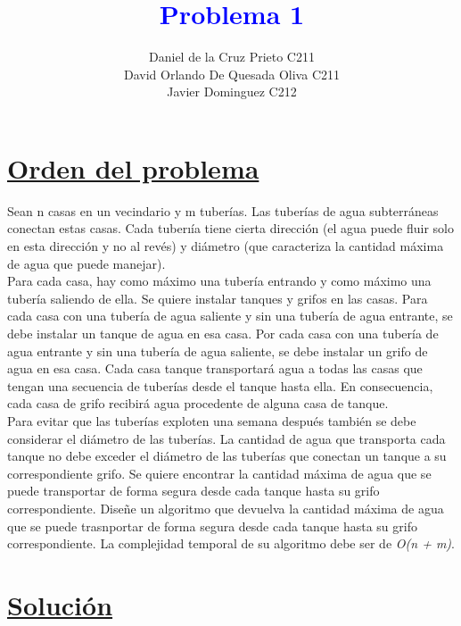 \documentclass{article}
\begin{document}
    \title{\textcolor{blue}{\textbf{Problema 1 }}\\}
    \author{Daniel de la Cruz Prieto C211\\ David Orlando De Quesada Oliva C211\\Javier Dominguez C212} 
    \date{}
    \maketitle  

    \section{\underline{Orden del problema}} 

    Sean n casas en un vecindario y m tuber\'ias. Las tuber\'ias de agua subterr\'aneas conectan estas casas. Cada
    tuberı\'ia tiene cierta direcci\'on (el agua puede fluir solo en esta direcci\'on y no al rev\'es) y di\'ametro (que caracteriza
    la cantidad m\'axima de agua que puede manejar).
    \\[10pt]
    \noindent Para cada casa, hay como m\'aximo una tuber\'ia entrando y como m\'aximo una tuber\'ia saliendo de ella. Se quiere
    instalar tanques y grifos en las casas. Para cada casa con una tuber\'ia de agua saliente y sin una tuber\'ia de agua
    entrante, se debe instalar un tanque de agua en esa casa. Por cada casa con una tuber\'ia de agua entrante y
    sin una tuber\'ia de agua saliente, se debe instalar un grifo de agua en esa casa. Cada casa tanque transportar\'a
    agua a todas las casas que tengan una secuencia de tuber\'ias desde el tanque hasta ella. En consecuencia, cada
    casa de grifo recibir\'a agua procedente de alguna casa de tanque.
    \\[10pt]
    \noindent Para evitar que las tuber\'ias exploten una semana después tambi\'en se debe considerar el di\'ametro de las tuber\'ias.
    La cantidad de agua que transporta cada tanque no debe exceder el di\'ametro de las tuber\'ias que conectan un
    tanque a su correspondiente grifo. Se quiere encontrar la cantidad m\'axima de agua que se puede transportar de
    forma segura desde cada tanque hasta su grifo correspondiente. Dise\~ne un algoritmo que devuelva la cantidad
    m\'axima de agua que se puede trasnportar de forma segura desde cada tanque hasta su grifo correspondiente.
    La complejidad temporal de su algoritmo debe ser de \textit{O(n + m)}.
    
    \newpage
    \section{\underline{Soluci\'on}}
\end{document}
